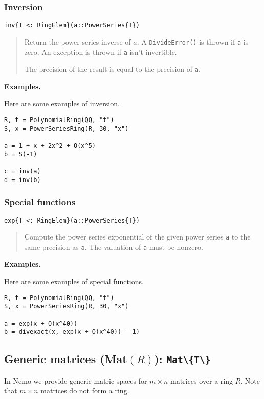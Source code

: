 \documentclass[a4paper,10pt]{article}
\newcommand{\code}{\lstinline}
\newcommand{\desc}[1]{\vspace{-3mm}\begin{quote}#1\end{quote}}
\begin{document}
\subsubsection{Inversion}

\begin{lstlisting}
inv{T <: RingElem}(a::PowerSeries{T})
\end{lstlisting}

\desc{Return the power series inverse of $a$. A \code{DivideError()} is thrown 
if \code{a} is zero. An exception is thrown if \code{a} isn't invertible.

The precision of the result is equal to the precision of \code{a}.}

\textbf{Examples.}

Here are some examples of inversion.

\begin{lstlisting}
R, t = PolynomialRing(QQ, "t")
S, x = PowerSeriesRing(R, 30, "x")

a = 1 + x + 2x^2 + O(x^5)
b = S(-1)

c = inv(a)
d = inv(b)
\end{lstlisting}

\subsubsection{Special functions}

\begin{lstlisting}
exp{T <: RingElem}(a::PowerSeries{T})
\end{lstlisting}

\desc{Compute the power series exponential of the given power series \code{a}
to the same precision as \code{a}. The valuation of \code{a} must be nonzero.}

\textbf{Examples.}

Here are some examples of special functions.

\begin{lstlisting}
R, t = PolynomialRing(QQ, "t")
S, x = PowerSeriesRing(R, 30, "x")

a = exp(x + O(x^40))
b = divexact(x, exp(x + O(x^40)) - 1)
\end{lstlisting}

\subsection{Generic matrices (Mat$(R)$): \code|Mat\{T\}|}

In Nemo we provide generic matric spaces for $m\times n$ matrices over a ring $R$.
Note that $m\times n$ matrices do not form a ring.
\end{document}
